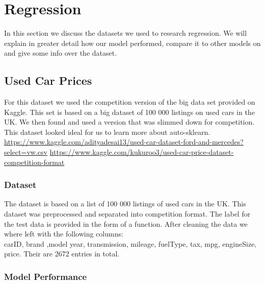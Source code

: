 \chapter{Regression}
In this section we discuss the datasets we used to research regression.
We will explain in greater detail how our model performed, compare it to other models on and give some info over the dataset.

\section{Used Car Prices}
For this dataset we used the competition version of the big data set provided on Kaggle. This set is based on a big dataset of 100 000 listings on used cars in the UK. We then found and used a version that was slimmed down for competition. This dataset looked ideal for us to learn more about auto-sklearn.
\\
\url{https://www.kaggle.com/adityadesai13/used-car-dataset-ford-and-mercedes?select=vw.csv}
\url{https://www.kaggle.com/kukuroo3/used-car-price-dataset-competition-format}

\subsection{Dataset}

The dataset is based on a list of 100 000 listings of used cars in the UK.
This dataset was preprocessed and separated into competition format.
The label for the test data is provided in the form of a function.
After cleaning the data we where left with the following columns:
\\
carID, brand ,model year, transmission, mileage, fuelType, tax, mpg, engineSize, price.
Their are 2672 entries in total.
\subsection{Model Performance}

